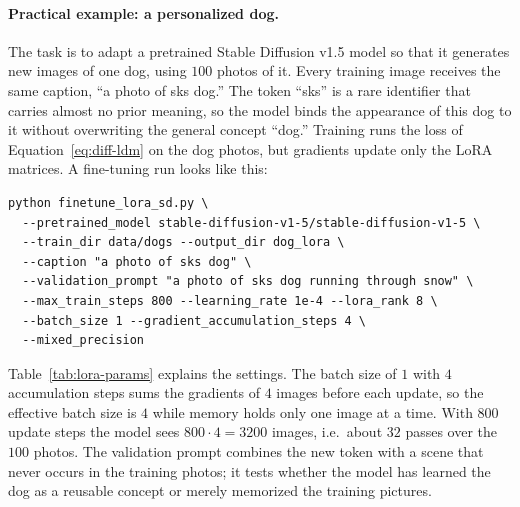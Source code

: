 \paragraph{Practical example: a personalized dog.}
The task is to adapt a pretrained Stable Diffusion v1.5 model so that it
generates new images of one dog, using $100$ photos of it. Every training
image receives the same caption, ``a photo of sks dog.'' The token ``sks'' is
a rare identifier that carries almost no prior meaning, so the model binds the
appearance of this dog to it without overwriting the general concept ``dog.''
Training runs the loss of Equation~\ref{eq:diff-ldm} on the dog photos, but
gradients update only the LoRA matrices. A fine-tuning run looks like this:
\par\noindent\begin{minipage}{\linewidth}
\begin{verbatim}
python finetune_lora_sd.py \
  --pretrained_model stable-diffusion-v1-5/stable-diffusion-v1-5 \
  --train_dir data/dogs --output_dir dog_lora \
  --caption "a photo of sks dog" \
  --validation_prompt "a photo of sks dog running through snow" \
  --max_train_steps 800 --learning_rate 1e-4 --lora_rank 8 \
  --batch_size 1 --gradient_accumulation_steps 4 \
  --mixed_precision
\end{verbatim}
\end{minipage}

\smallskip\noindent
Table~\ref{tab:lora-params} explains the settings. The batch size of $1$ with
$4$ accumulation steps sums the gradients of $4$ images before each update,
so the effective batch size is $4$ while memory holds only one image at a
time. With $800$ update steps the model sees $800\cdot4=3200$ images, i.e.\
about $32$ passes over the $100$ photos. The validation prompt combines the
new token with a scene that never occurs in the training photos; it tests
whether the model has learned the dog as a reusable concept or merely
memorized the training pictures.


